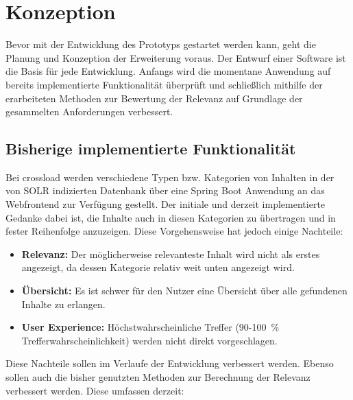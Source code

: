 \chapter{Konzeption}
\label{ch:conception}
Bevor mit der Entwicklung des Prototyps gestartet werden kann, geht die Planung und Konzeption der Erweiterung voraus.
Der Entwurf einer Software ist die Basis für jede Entwicklung.
Anfangs wird die momentane Anwendung auf bereits implementierte Funktionalität überprüft und schließlich mithilfe der erarbeiteten Methoden zur Bewertung der Relevanz auf Grundlage der gesammelten Anforderungen verbessert.

\section{Bisherige implementierte Funktionalität}
\label{sec:implementedFunctionality}
Bei \gls{crossload} werden verschiedene Typen bzw. Kategorien von Inhalten in der von SOLR indizierten Datenbank über eine Spring Boot Anwendung an das Webfrontend zur Verfügung gestellt.
Der initiale und derzeit implementierte Gedanke dabei ist, die Inhalte auch in diesen Kategorien zu übertragen und in fester Reihenfolge anzuzeigen.
Diese Vorgehensweise hat jedoch einige Nachteile:

\begin{itemize}
  \item \textbf{Relevanz:} Der möglicherweise relevanteste Inhalt wird nicht als erstes angezeigt, da dessen Kategorie relativ weit unten angezeigt wird.
  \item \textbf{Übersicht:} Es ist schwer für den Nutzer eine Übersicht über alle gefundenen Inhalte zu erlangen.
  \item \textbf{User Experience:} Höchstwahrscheinliche Treffer (90-100 \% Trefferwahrscheinlichkeit) werden nicht direkt vorgeschlagen.
\end{itemize}

Diese Nachteile sollen im Verlaufe der Entwicklung verbessert werden.
Ebenso sollen auch die bisher genutzten Methoden zur Berechnung der Relevanz verbessert werden.
Diese umfassen derzeit:

